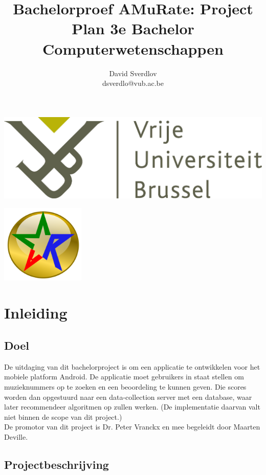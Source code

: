 \documentclass[11pt,a4paper]{article}
\author{David Sverdlov \\ dsverdlo@vub.ac.be}
\title{Bachelorproef AMuRate: Project Plan 3e Bachelor Computerwetenschappen}
\begin{document}
\begin{flushleft}
\noindent \includegraphics[width=0.6\linewidth]{vub_logo.jpg} 
\end{flushleft}
{\let\newpage\relax\maketitle} %

\begin{center}
\includegraphics[width=4cm]{amr_gold_thick.png} 
\end{center}



\newpage
\tableofcontents

\newpage
\section{Inleiding}
	\subsection{Doel}
De uitdaging van dit bachelorproject is om een applicatie te ontwikkelen voor het mobiele platform Android. De applicatie moet gebruikers in staat stellen om muzieknummers op te zoeken en een beoordeling te kunnen geven. Die scores worden dan opgestuurd naar een data-collection server met een database, waar later recommendeer algoritmen op zullen werken. (De implementatie daarvan valt niet binnen de scope van dit project.) \\
De promotor van dit project is Dr. Peter Vranckx en mee begeleidt door Maarten Deville.

	\subsection{Projectbeschrijving}
	
\end{document}
